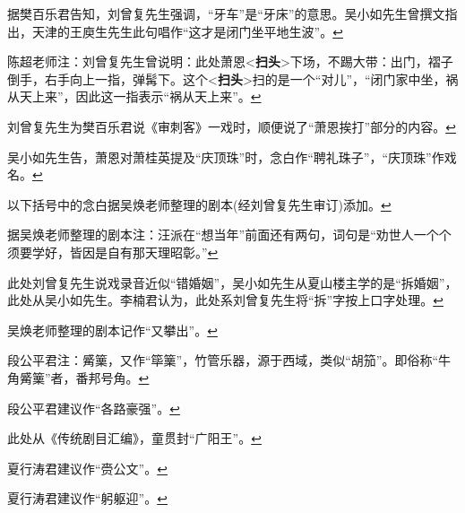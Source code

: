 \item
  \leavevmode\hypertarget{fn515}{}%
  据樊百乐君告知，刘曾复先生强调，``牙车''是``牙床''的意思。吴小如先生曾撰文指出，天津的王庾生先生此句唱作``这才是闭门坐平地生波''。\protect\hyperlink{fnref515}{↩}
\item
  \leavevmode\hypertarget{fn516}{}%
  陈超老师注：刘曾复先生曾说明：此处萧恩\textless{}\textbf{扫头}\textgreater{}下场，不踢大带：出门，褶子倒手，右手向上一指，弹髯下。这个\textless{}\textbf{扫头}\textgreater{}扫的是一个``对儿''，``闭门家中坐，祸从天上来''，因此这一指表示``祸从天上来''。\protect\hyperlink{fnref516}{↩}
\item
  \leavevmode\hypertarget{fn517}{}%
  刘曾复先生为樊百乐君说《审刺客》一戏时，顺便说了``萧恩挨打''部分的内容。\protect\hyperlink{fnref517}{↩}
\item
  \leavevmode\hypertarget{fn518}{}%
  吴小如先生告，萧恩对萧桂英提及``庆顶珠''时，念白作``聘礼珠子''，``庆顶珠''作戏名。\protect\hyperlink{fnref518}{↩}
\item
  \leavevmode\hypertarget{fn519}{}%
  以下括号中的念白据吴焕老师整理的剧本(经刘曾复先生审订)添加。\protect\hyperlink{fnref519}{↩}
\item
  \leavevmode\hypertarget{fn520}{}%
  据吴焕老师整理的剧本注：汪派在``想当年''前面还有两句，词句是``劝世人一个个须要学好，皆因是自有那天理昭彰。''\protect\hyperlink{fnref520}{↩}
\item
  \leavevmode\hypertarget{fn521}{}%
  此处刘曾复先生说戏录音近似``错婚姻''，吴小如先生从夏山楼主学的是``拆婚姻''，此处从吴小如先生。李楠君认为，此处系刘曾复先生将``拆''字按上口字处理。\protect\hyperlink{fnref521}{↩}
\item
  \leavevmode\hypertarget{fn522}{}%
  吴焕老师整理的剧本记作``又攀出''。\protect\hyperlink{fnref522}{↩}
\item
  \leavevmode\hypertarget{fn523}{}%
  段公平君注：觱篥，又作``筚篥''，竹管乐器，源于西域，类似``胡笳''。即俗称``牛角觱篥''者，番邦号角。\protect\hyperlink{fnref523}{↩}
\item
  \leavevmode\hypertarget{fn524}{}%
  段公平君建议作``各路豪强''。\protect\hyperlink{fnref524}{↩}
\item
  \leavevmode\hypertarget{fn525}{}%
  此处从《传统剧目汇编》，童贯封``广阳王''。\protect\hyperlink{fnref525}{↩}
\item
  \leavevmode\hypertarget{fn526}{}%
  夏行涛君建议作``赍公文''。\protect\hyperlink{fnref526}{↩}
\item
  \leavevmode\hypertarget{fn527}{}%
  夏行涛君建议作``躬躯迎''。\protect\hyperlink{fnref527}{↩}
